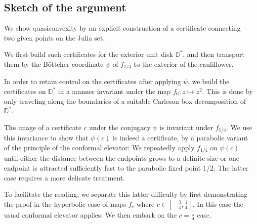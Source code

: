 \subsection{Sketch of the argument}

We show quasiconvexity by an explicit construction of a certificate connecting two given points on the Julia set.

We first build such certificates for the exterior unit disk $\mathbb D ^*$, and then transport them by the Böttcher coordinate $\psi$ of $f_{1/4}$ to the exterior of the cauliflower.

In order to retain control on the certificates after applying $\psi$, we build the certificates on $\mathbb D^*$ in a manner invariant under the map $f_0: z\mapsto z^2$. This is done by only traveling along the boundaries of a suitable Carleson box decomposition of $\mathbb D^{*}$.

The image of a certificate $c$ under the conjugacy $\psi$ is invariant under $f_{1/4}$. We use this invariance to show that $\psi(c)$ is indeed a certificate, by a parabolic variant of the principle of the conformal elevator: We repeatedly apply $f_{1/4}$ on $\psi(c)$ until either the distance between the endpoints grows to a definite size or one endpoint is attracted sufficiently fast to the parabolic fixed point $1/2$. The latter case requires a more delicate treatment.

To facilitate the reading, we separate this latter difficulty by first demonstrating the proof in the hyperbolic case of maps $f_c$ where  $c\in\left[-\frac 34,\frac{1}{4}\right]$. In this case the usual conformal elevator applies. We then embark on the $c=\frac 14$ case.

\begin{comment}
We decompose $\D^{*}$ into Carleson boxes invariant under
$z^{2}$ and connect points on the unit circle by traveling on the
boundary of these boxes. Both the boxes and the path on their boundary
respect the dynamics of $z^{2}$ there, which allow us to transport
these paths from $\D^{*}$ to the exterior of $\mathcal{J}(f_{c})$ 


We construct two collections of curves, which we call "express"
and "peripheral" tracks. We use the metaphor
of a train traveling between the endpoints and switching between tracks.
We stitch the quasiconvexity certificates out of these tracks.

\end{comment}

